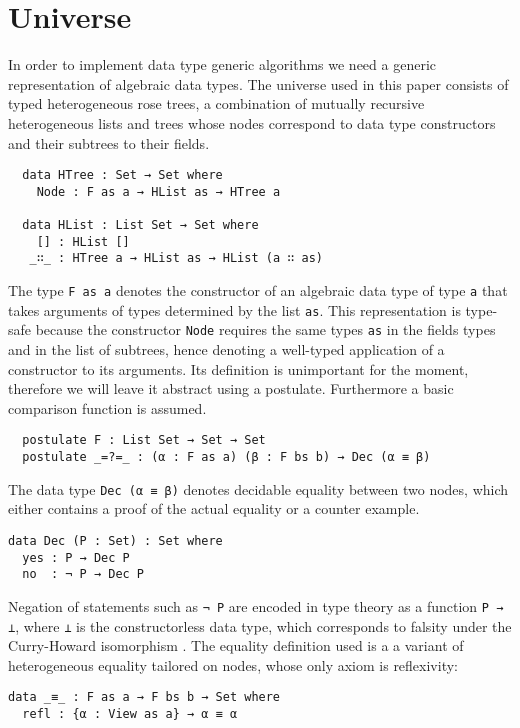 \documentclass[preprint]{sigplanconf}
\begin{document}
\section{Universe}
In order to implement data type generic algorithms we need a generic representation of algebraic data types.
The universe used in this paper consists of typed heterogeneous rose trees,
a combination of mutually recursive heterogeneous lists and trees
whose nodes correspond to data type constructors and their subtrees
to their fields.
\begin{verbatim}
  data HTree : Set → Set where
    Node : F as a → HList as → HTree a

  data HList : List Set → Set where
    [] : HList []
   _∷_ : HTree a → HList as → HList (a ∷ as)
\end{verbatim}
	The type \texttt{F as a} denotes the constructor of an algebraic data
	type of type \texttt{a} that takes arguments of types determined by the list 
	\texttt{as}. This representation is type-safe because the constructor
	\texttt{Node} requires the same types \texttt{as} in the fields types and in 
	the list of subtrees, hence denoting a 	well-typed application of a 
	constructor to its arguments.
	Its definition is unimportant for the moment, therefore we will leave it
	abstract using a postulate. Furthermore a basic comparison
	function is assumed.
\begin{verbatim}
  postulate F : List Set → Set → Set 
  postulate _=?=_ : (α : F as a) (β : F bs b) → Dec (α ≡ β)
\end{verbatim}	
	The data type \texttt{Dec (α ≡ β)} denotes decidable equality between
	two nodes, which either contains a proof of the actual equality
	or a counter example.
\begin{verbatim}
data Dec (P : Set) : Set where
  yes : P → Dec P
  no  : ¬ P → Dec P
\end{verbatim}
	Negation of statements such as \texttt{¬ P} are encoded in type theory as
	a function \texttt{P → ⊥}, where \texttt{⊥} is
	the constructorless data type, which corresponds to falsity 
	under the Curry-Howard isomorphism \cite{PropositionAsTypes}.
	The equality definition used is a a variant of heterogeneous equality
	tailored on nodes, whose only axiom is reflexivity:
\begin{verbatim}
data _≡_ : F as a → F bs b → Set where
  refl : {α : View as a} → α ≡ α
\end{verbatim}
\end{document}
